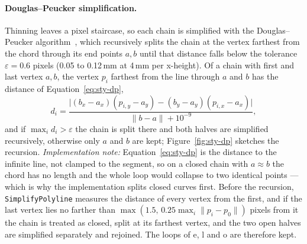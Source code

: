 \paragraph{Douglas--Peucker simplification.}
Thinning leaves a pixel staircase, so each chain is simplified with the Douglas--Peucker algorithm~\cite{douglas1973}, which recursively splits the chain at the vertex farthest from the chord through its end points $a,b$ until that distance falls below the tolerance $\varepsilon=0.6$ pixels (0.05 to 0.12\,mm at 4\,mm per x-height).
Of a chain with first and last vertex $a,b$, the vertex $p_i$ farthest from the line through $a$ and $b$ has the distance of Equation~\ref{eq:sty-dp},
\begin{equation}
d_i=\frac{\bigl|(b_x-a_x)(p_{i,y}-a_y)-(b_y-a_y)(p_{i,x}-a_x)\bigr|}{\lVert b-a\rVert+10^{-9}},
\label{eq:sty-dp}
\end{equation}
and if $\max_id_i>\varepsilon$ the chain is split there and both halves are simplified recursively, otherwise only $a$ and $b$ are kept; Figure~\ref{fig:sty-dp} sketches the recursion.
\emph{Implementation note:} Equation~\ref{eq:sty-dp} is the distance to the infinite line, not clamped to the segment, so on a closed chain with $a\approx b$ the chord has no length and the whole loop would collapse to two identical points --- which is why the implementation splits closed curves first.
Before the recursion, \texttt{SimplifyPolyline} measures the distance of every vertex from the first, and if the last vertex lies no farther than $\max(1.5,\,0.25\max_i\lVert p_i-p_0\rVert)$ pixels from it the chain is treated as closed, split at its farthest vertex, and the two open halves are simplified separately and rejoined.
The loops of e, l and o are therefore kept.


